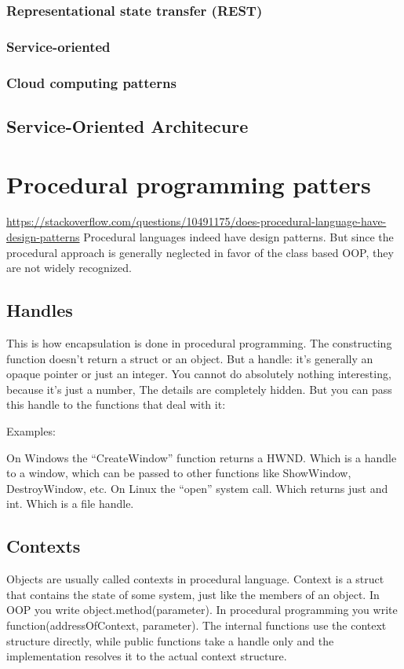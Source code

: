 \documentclass{book}
\begin{document}
\section{Representational state transfer (REST)}
\section{Service-oriented}
\section{Cloud computing patterns}

\chapter{Service-Oriented Architecure}\label{SOA}

\part{Procedural programming patters}
\url{https://stackoverflow.com/questions/10491175/does-procedural-language-have-design-patterns}
Procedural languages indeed have design patterns. But since the procedural approach is generally neglected in favor of the class based OOP, they are not widely recognized.


\chapter{Handles}

This is how encapsulation is done in procedural programming. The constructing function doesn't return a struct or an object. 
But a handle: it's generally an opaque pointer or just an integer. You cannot do absolutely nothing interesting, because it's just a number, The details are completely hidden. 
But you can pass this handle to the functions that deal with it:

Examples:

    On Windows the ``CreateWindow'' function returns a HWND. Which is a handle to a window, which can be passed to other functions like ShowWindow, DestroyWindow, etc.
    On Linux the ``open'' system call. Which returns just and int. Which is a file handle.

\chapter{Contexts}

Objects are usually called contexts in procedural language. Context is a struct that contains the state of some system, just like the members of an object. 
In OOP you write object.method(parameter). In procedural programming you write function(addressOfContext, parameter). 
The internal functions use the context structure directly, while public functions take a handle only and the implementation resolves it to the actual context structure.
\end{document}
